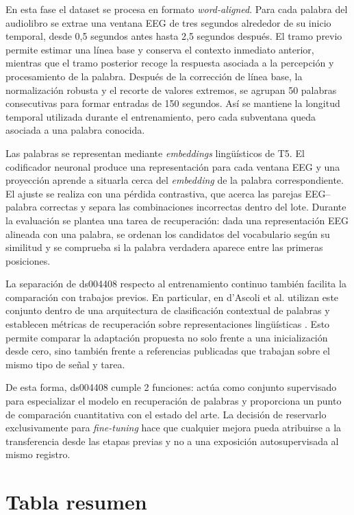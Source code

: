 En esta fase el dataset se procesa en formato \textit{word-aligned}. Para cada palabra del audiolibro se extrae una ventana EEG de tres segundos alrededor de su inicio temporal, desde 0,5 segundos antes hasta 2,5 segundos después. El tramo previo permite estimar una línea base y conserva el contexto inmediato anterior, mientras que el tramo posterior recoge la respuesta asociada a la percepción y procesamiento de la palabra. Después de la corrección de línea base, la normalización robusta y el recorte de valores extremos, se agrupan 50 palabras consecutivas para formar entradas de 150 segundos. Así se mantiene la longitud temporal utilizada durante el entrenamiento, pero cada subventana queda asociada a una palabra conocida.

Las palabras se representan mediante \textit{embeddings} lingüísticos de T5. El codificador neuronal produce una representación para cada ventana EEG y una proyección aprende a situarla cerca del \textit{embedding} de la palabra correspondiente. El ajuste se realiza con una pérdida contrastiva, que acerca las parejas EEG--palabra correctas y separa las combinaciones incorrectas dentro del lote. Durante la evaluación se plantea una tarea de recuperación: dada una representación EEG alineada con una palabra, se ordenan los candidatos del vocabulario según su similitud y se comprueba si la palabra verdadera aparece entre las primeras posiciones.

La separación de ds004408 respecto al entrenamiento continuo también facilita la comparación con trabajos previos. En particular, en d'Ascoli et al. utilizan este conjunto dentro de una arquitectura de clasificación contextual de palabras y establecen métricas de recuperación sobre representaciones lingüísticas \cite{dascoli2024words}. Esto permite comparar la adaptación propuesta no solo frente a una inicialización desde cero, sino también frente a referencias publicadas que trabajan sobre el mismo tipo de señal y tarea.

De esta forma, ds004408 cumple 2 funciones: actúa como conjunto supervisado para especializar el modelo en recuperación de palabras y proporciona un punto de comparación cuantitativa con el estado del arte. La decisión de reservarlo exclusivamente para \textit{fine-tuning} hace que cualquier mejora pueda atribuirse a la transferencia desde las etapas previas y no a una exposición autosupervisada al mismo registro.

\section{Tabla resumen}

